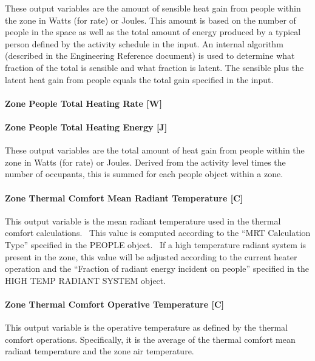 These output variables are the amount of sensible heat gain from people within the zone in Watts (for rate) or Joules. This amount is based on the number of people in the space as well as the total amount of energy produced by a typical person defined by the activity schedule in the input. An internal algorithm (described in the Engineering Reference document) is used to determine what fraction of the total is sensible and what fraction is latent. The sensible plus the latent heat gain from people equals the total gain specified in the input.

\paragraph{Zone People Total Heating Rate {[}W{]}}\label{zone-people-total-heating-rate-w}

\paragraph{Zone People Total Heating Energy {[}J{]}}\label{zone-people-total-heating-energy-j}

These output variables are the total amount of heat gain from people within the zone in Watts (for rate) or Joules. Derived from the activity level times the number of occupants, this is summed for each people object within a zone.

\paragraph{Zone Thermal Comfort Mean Radiant Temperature {[}C{]}}\label{zone-thermal-comfort-mean-radiant-temperature-c}

This output variable is the mean radiant temperature used in the thermal comfort calculations.~ This value is computed according to the ``MRT Calculation Type'' specified in the PEOPLE object.~ If a high temperature radiant system is present in the zone, this value will be adjusted according to the current heater operation and the ``Fraction of radiant energy incident on people'' specified in the HIGH TEMP RADIANT SYSTEM object.

\paragraph{Zone Thermal Comfort Operative Temperature {[}C{]}}\label{zone-thermal-comfort-operative-temperature-c}

This output variable is the operative temperature as defined by the thermal comfort operations. Specifically, it is the average of the thermal comfort mean radiant temperature and the zone air temperature.

